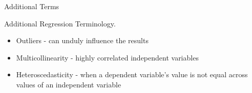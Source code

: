 \documentclass[11pt]{beamer}
\begin{document}
\begin{frame}{
	\begin{minipage}[t]{0.55\textwidth}
		Additional Terms
	\end{minipage}
	\hfill
	\begin{minipage}[t]{0.35\textwidth}
		\flushright
	\end{minipage}
}{}
Additional Regression Terminology.

\begin{itemize}
	\item Outliers - can unduly influence the results
	\item Multicollinearity - highly correlated independent variables
	\item Heteroscedasticity - when a dependent variable's value is not equal across values of an independent variable
\end{itemize}


\end{frame}
\end{document}
